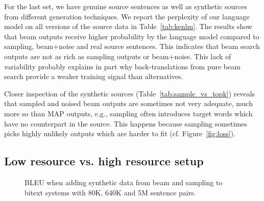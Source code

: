 \documentclass[11pt,a4paper]{article}
\begin{document}
For the last set, we have genuine source sentences as well as synthetic sources from different generation techniques. 
We report the perplexity of our language model on all versions of the source data in Table~\ref{tab:kenlm}. 
The results show that beam outputs receive higher probability by the language model compared to sampling, beam+noise and real source sentences. 
This indicates that beam search outputs are not as rich as sampling outputs or beam+noise. 
This lack of variability probably explains in part why back-translations from pure beam search provide a weaker training signal than alternatives.


Closer inspection of the synthetic sources (Table~\ref{tab:sample_vs_topk}) reveals that sampled and noised beam outputs are sometimes not very adequate, much more so than MAP outputs, e.g., sampling often introduces target words which have no counterpart in the source.
This happens because sampling sometimes picks highly unlikely outputs which are harder to fit (cf. Figure~\ref{fig:loss}).



\subsection{Low resource vs. high resource setup}
\label{sec:lowres}

\begin{figure}[t]
\begin{center}
\caption{BLEU when adding synthetic data from beam and sampling to bitext systems with 80K, 640K and 5M sentence pairs.
\label{fig:beam_vs_sample}}
\end{center}
\end{figure}
\end{document}
